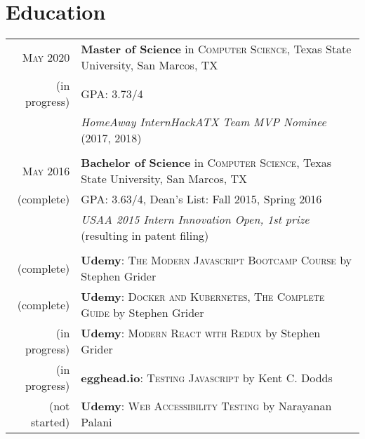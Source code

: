 \documentclass[a4paper,10pt]{article}
\begin{document}
\section{Education}
\begin{tabular}{rl}	
	\textsc{May} 2020 & \textbf{Master of Science} in \textsc{Computer Science}, Texas State University, San Marcos, TX\\
	
	(in progress) &\normalsize \textsc{GPA}: 3.73/4 \\ 
	
	& \emph{HomeAway InternHackATX Team MVP Nominee} (2017, 2018) \\
	
	& \\
	
	\textsc{May} 2016 & \textbf{Bachelor of Science} in \textsc{Computer Science}, Texas State University, San Marcos, TX \\
	
	(complete) &\normalsize \textsc{GPA}: 3.63/4,  Dean's List: Fall 2015, Spring 2016 \\
	
	& \emph{USAA 2015 Intern Innovation Open, 1st prize} (resulting in patent filing)  \\
	
	& \\
	
	(complete) & \textbf{Udemy}: \textsc{The Modern Javascript Bootcamp Course} by Stephen Grider \\
	
	(complete) & \textbf{Udemy}: \textsc{Docker and Kubernetes, The Complete Guide} by Stephen Grider \\
	
	(in progress) & \textbf{Udemy}: \textsc{Modern React with Redux} by Stephen Grider \\
	
	(in progress) & \textbf{egghead.io}: \textsc{Testing Javascript} by Kent C. Dodds \\
	
	(not started) & \textbf{Udemy}: \textsc{Web Accessibility Testing} by Narayanan Palani \\
	
	
\end{tabular}

\end{document}

